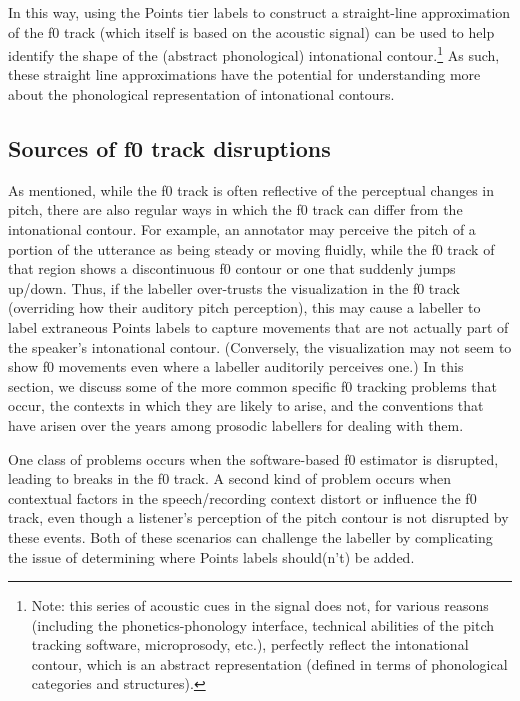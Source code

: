 \documentclass[11pt, twoside]{memoir}
\begin{document}
In this way, using the Points tier labels to construct a straight-line approximation of the f0 track (which itself is based on the acoustic signal) can be used to help identify the shape of the (abstract phonological) intonational contour.\footnote{Note: this series of acoustic cues in the signal does not, for various reasons (including the phonetics-phonology interface, technical abilities of the pitch tracking software, microprosody, etc.), perfectly reflect the intonational contour, which is an abstract representation (defined in terms of phonological categories and structures).} As such, these straight line approximations have the potential for understanding more about the phonological representation of intonational contours.

\subsection{Sources of f0 track disruptions}\label{sec:a-brief-overview-of-sources-of-pitch-track-disruptions}

As mentioned, while the f0 track is often reflective of the perceptual changes in pitch, there are also regular ways in which the f0 track can differ from the intonational contour. For example, an annotator may perceive the pitch of a portion of the utterance as being steady or moving fluidly, while the f0 track of that region shows a discontinuous f0 contour or one that suddenly jumps up\slash down. Thus, if the labeller over-trusts the visualization in the f0 track (overriding how their auditory pitch perception), this may cause a labeller to label extraneous Points labels to capture movements that are not actually part of the speaker’s intonational contour. (Conversely, the visualization may not seem to show f0 movements even where a labeller auditorily perceives one.) In this section, we discuss some of the more common specific f0 tracking problems that occur, the contexts in which they are likely to arise, and the conventions that have arisen over the years among prosodic labellers for dealing with them.

One class of problems occurs when the software-based f0 estimator is disrupted, leading to breaks in the f0 track. A second kind of problem occurs when contextual factors in the speech\slash recording context distort or influence the f0 track, even though a listener’s perception of the pitch contour is not disrupted by these events. Both of these scenarios can challenge the labeller by complicating the issue of determining where Points labels should(n’t) be added.
\end{document}
